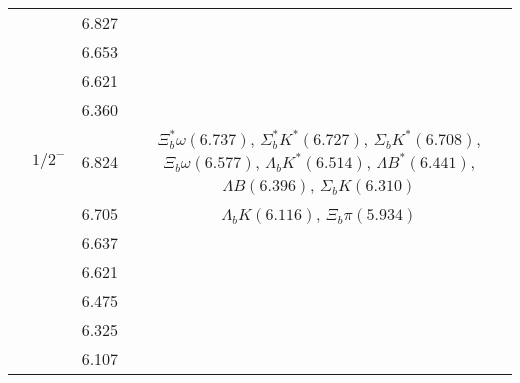 \documentclass[prd,twocolumn,floatfix,nofootinbib]{revtex4}
\begin{document}
\begin{table*}[!htbp]
\begin{tabular}{cccc}
            &               &6.827  & \\
            &               &6.653  & \\
            &               &6.621  & \\
            &               &6.360  & \\
            &${1/2}^{-}$    &6.824  &$\Xi_{b}^{\ast}\omega(6.737)$, $\Sigma_{b}^{\ast}K^{\ast}(6.727)$, $\Sigma_{b}K^{\ast}(6.708)$, $\Xi_{b}\omega(6.577)$, $\Lambda_{b}K^{\ast}(6.514)$, $\Lambda B^{\ast}(6.441)$, $\Lambda B(6.396)$, $\Sigma_{b}K(6.310)$ \\
            &               &6.705  &$\Lambda_{b}K(6.116)$, $\Xi_{b}\pi(5.934)$ \\
            &               &6.637  & \\
            &               &6.621  & \\
            &               &6.475  & \\
            &               &6.325  & \\
            &               &6.107  & \\
        \hline\hline
    \end{tabular}
\end{table*}
\end{document}
